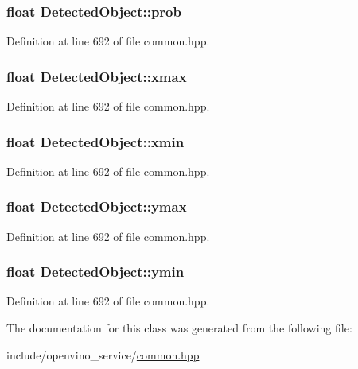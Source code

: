 \subsubsection[{\texorpdfstring{prob}{prob}}]{\setlength{\rightskip}{0pt plus 5cm}float Detected\+Object\+::prob}\hypertarget{classDetectedObject_a1d49d73edce36d93ee88b202bdcb961d}{}\label{classDetectedObject_a1d49d73edce36d93ee88b202bdcb961d}


Definition at line 692 of file common.\+hpp.

\subsubsection[{\texorpdfstring{xmax}{xmax}}]{\setlength{\rightskip}{0pt plus 5cm}float Detected\+Object\+::xmax}\hypertarget{classDetectedObject_a8e120d3f08cb0f6c41b10a082bd0df04}{}\label{classDetectedObject_a8e120d3f08cb0f6c41b10a082bd0df04}


Definition at line 692 of file common.\+hpp.

\subsubsection[{\texorpdfstring{xmin}{xmin}}]{\setlength{\rightskip}{0pt plus 5cm}float Detected\+Object\+::xmin}\hypertarget{classDetectedObject_af6a124efdbada32ae6cc6ed8207957ba}{}\label{classDetectedObject_af6a124efdbada32ae6cc6ed8207957ba}


Definition at line 692 of file common.\+hpp.

\subsubsection[{\texorpdfstring{ymax}{ymax}}]{\setlength{\rightskip}{0pt plus 5cm}float Detected\+Object\+::ymax}\hypertarget{classDetectedObject_ab130fc061e711904966077c8b8e294e7}{}\label{classDetectedObject_ab130fc061e711904966077c8b8e294e7}


Definition at line 692 of file common.\+hpp.

\subsubsection[{\texorpdfstring{ymin}{ymin}}]{\setlength{\rightskip}{0pt plus 5cm}float Detected\+Object\+::ymin}\hypertarget{classDetectedObject_a18ef6bb15e7c47d41d9c2c9d4b8b133c}{}\label{classDetectedObject_a18ef6bb15e7c47d41d9c2c9d4b8b133c}


Definition at line 692 of file common.\+hpp.



The documentation for this class was generated from the following file\+:\begin{DoxyCompactItemize}
\item 
include/openvino\+\_\+service/\hyperlink{common_8hpp}{common.\+hpp}\end{DoxyCompactItemize}
